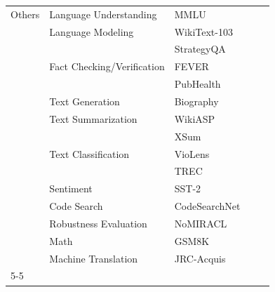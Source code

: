 \begin{table}[]
\begin{tabular}{@{}lllll@{}}
Others                 & Language Understanding     & MMLU~                     &                  &  \\
                       & Language Modeling          & WikiText-103~            &                            &  \\
                       &                            & StrategyQA~            &                     &  \\
                        & Fact Checking/Verification & FEVER~                     &                            &  \\
                       &                            & PubHealth~                 &                                            &  \\ 
                       & Text Generation            & Biography~                 &                                              &  \\
                       & Text Summarization         & WikiASP~                   &                                                         &  \\
                       &                            & XSum~                      &                                                     &  \\
                       & Text Classification        & VioLens~                   &                                         &  \\
                       &                            & TREC~                      &                                                          &  \\
                       & Sentiment                  & SST-2~                   &                                             &  \\
                       & Code Search                & CodeSearchNet~             &                                         &  \\
                       & Robustness Evaluation      & NoMIRACL~                  &                                    &  \\
                       & Math                       & GSM8K~                     &                                                       &  \\ 
                       & Machine Translation        & JRC-Acquis~                &                                                  & \\ \cmidrule(l){5-5} 
                       \midrule
\end{tabular}
\end{table}

